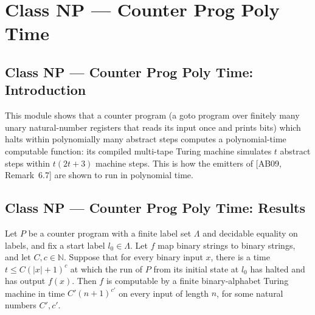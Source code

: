 \section{Class NP --- Counter Prog Poly Time}
\subsection*{Class NP --- Counter Prog Poly Time: Introduction}

This module shows that a counter program (a goto program over finitely many unary
natural-number registers that reads its input once and prints bits) which halts within
polynomially many abstract steps computes a polynomial-time computable function: its
compiled multi-tape Turing machine simulates $t$ abstract steps within $t(2t+3)$ machine
steps. This is how the emitters of [AB09, Remark~6.7] are shown to run in polynomial time.

\subsection*{Class NP --- Counter Prog Poly Time: Results}

\begin{theorem}
\label{Complexity.CounterProg.polyTimeComputable}
\leanok
{}
Let $P$ be a counter program with a finite label set $\Lambda$ and decidable equality on
labels, and fix a start label $l_0\in\Lambda$. Let $f$ map binary strings to binary
strings, and let $C,c\in\mathbb{N}$. Suppose that for every binary input $x$, there is a
time $t\le C(|x|+1)^c$ at which the run of $P$ from its initial state at $l_0$ has
halted and has output $f(x)$. Then $f$ is computable by a finite binary-alphabet Turing
machine in time $C' (n+1)^{c'}$ on every input of length $n$, for some natural numbers
$C',c'$.
\end{theorem}

